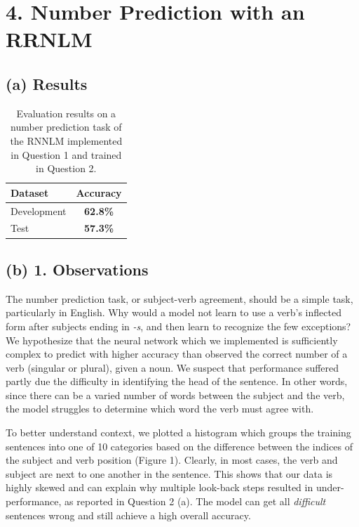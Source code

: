 \documentclass{article}
\begin{document}
\section*{4. Number Prediction with an RRNLM}
\subsection*{(a) Results}


\begin{table}[h]
\begin{center}
\begin{scriptsize}
\begin{tabular}{lc}
\hline
\abovespace\belowspace
Dataset & Accuracy \\
\hline
\abovespace
Development &  \textbf{62.8\%} \\
\belowspace
Test &  \textbf{57.3\%} \\
\hline
\end{tabular}
\end{scriptsize}
\caption{Evaluation results on a number prediction task of the RNNLM implemented in Question 1 and trained in Question 2.}
\end{center}
\end{table}



\newpage

\subsection*{(b) 1. Observations}
The number prediction task, or subject-verb agreement, should be a simple task, particularly in English. Why would a model not learn to use a verb's inflected form after subjects ending in \textit{-s}, and then learn to recognize the few exceptions? We hypothesize that the neural network which we implemented is sufficiently complex to predict with higher accuracy than observed the correct number of a verb (singular or plural), given a noun. We suspect that performance suffered partly due the difficulty in identifying the head of the sentence. In other words, since there can be a varied number of words between the subject and the verb, the model struggles to determine which word the verb must agree with.

To better understand context, we plotted a histogram which groups the training sentences into one of 10 categories based on the difference between the indices of the subject and verb position (Figure 1). Clearly, in most cases, the verb and subject are next to one another in the sentence. This shows that our data is highly skewed and can explain why multiple look-back steps resulted in under-performance, as reported in Question 2 (a). The model can get all \textit{difficult} sentences wrong and still achieve a high overall accuracy.
\end{document}
